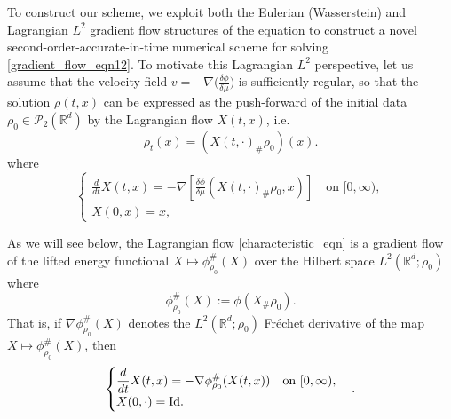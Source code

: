 \documentclass[11pt,a4paper]{amsart}
\newcommand{\1}{\mathds{1}}
\newcommand{\R}{{\mathbb R}}
\newcommand{\PP}{\mathcal{P}}
\numberwithin{equation}{section}
\begin{document}
To construct our scheme, we exploit both the Eulerian (Wasserstein) and Lagrangian $L^2$ gradient flow structures of the equation to construct a novel second-order-accurate-in-time numerical scheme for solving \eqref{gradient_flow_eqn12}. To motivate this Lagrangian $L^2$ perspective, let us assume that the velocity field $v=-\nabla \bigl( \frac{\delta \phi}{\delta \mu} \bigr)$ is sufficiently regular, so that the solution $\rho(t,x)$ can be expressed as the push-forward of the initial data $\rho_0\in \PP_2(\R^d)$ by the Lagrangian flow $X(t,x)$, i.e.
\begin{equation}
\rho_t(x) = (X(t,\cdot)_{\#} \rho_0)(x). \label{pushforward_rho_def}
\end{equation}
where
\begin{equation}
\begin{cases} 
\displaystyle \frac{d}{dt}X(t,x)  =-\nabla \left[ \frac{\delta \phi}{\delta \mu}( X(t,\cdot)_{\#} \rho_0,x) \right] \quad \text{on } [0,\infty),  \\
X(0,x) = x, \label{characteristic_eqn}
\end{cases}
\end{equation}

As we will see below, the Lagrangian flow \eqref{characteristic_eqn} is a gradient flow of the lifted energy functional $X\mapsto \phi^{\#}_{\rho_0}(X)$ over the Hilbert space $L^2(\R^d;\rho_0)$ where
\begin{equation} \phi^{\#}_{\rho_0}(X) := \phi(X_{\#} \rho_0). \label{lift_intro_def} \end{equation} That is, if $\nabla \phi^{\#}_{\rho_0}(X)$ denotes the $L^2(\R^d;\rho_0)$ Fréchet derivative of the map $X \mapsto \phi^{\#}_{\rho_0}(X)$, then
\begin{equation}
\begin{cases} 
\displaystyle \frac{d}{dt}X(t,x) = -\nabla \phi^{\#}_{\rho_0}(X(t,x)) \quad \text{on } [0,\infty),  \\
X(0,\cdot) = \textnormal{Id}. \label{L2_Lagrangian_Flow}
\end{cases}.
\end{equation}
\end{document}
